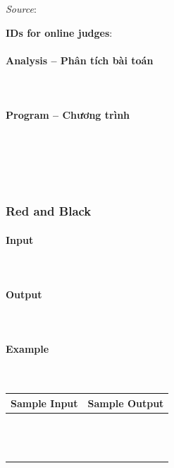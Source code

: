 \documentclass{article}
\begin{document}
\textit{Source}: 

\textbf{IDs for online judges}:

\paragraph{Analysis -- Phân tích bài toán} \mbox{} \\



\paragraph{Program -- Chương trình} \mbox{} \\


\begin{lstlisting}
	
	
\end{lstlisting}
\subsubsection{Red and Black}
 

\paragraph{Input} \mbox{} \\



\paragraph{Output}\mbox{} \\


\paragraph{Example}\mbox{} \\

\begin{table}[h]
    \centering
    \begin{tabular}{|l|r|}
        \hline
        \textbf{Sample Input} & \textbf{Sample Output} \\
        \hline
		&  \\ 
		&  \\ 
		&  \\ 
		&  \\ 
		&  \\
		&  \\ 
		&  \\ 
		&  \\ 
		&  \\ 
		&  \\ 
		&  \\ 
		&  \\
		&  \\ \hline
    \end{tabular}
\end{table}
\end{document}
